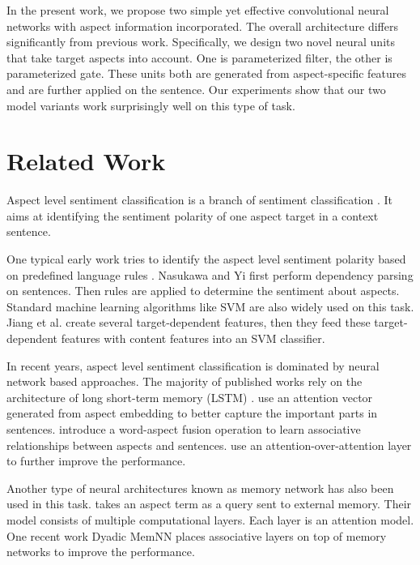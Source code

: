 \documentclass[11pt,a4paper]{article}
\begin{document}
In the present work, we propose two simple yet effective convolutional neural networks with aspect information incorporated. The overall architecture differs significantly from previous work. Specifically, we design two novel neural units that take target aspects into account. One is parameterized filter, the other is parameterized gate. These units both are generated from aspect-specific features and are further applied on the sentence. Our experiments show that our two model variants work surprisingly well on this type of task.  \section{Related Work}
Aspect level sentiment classification is a branch of sentiment classification \cite{pang2002thumbs,wang2012baselines}. It aims at identifying the sentiment polarity of one aspect target in a context sentence. 

One typical early work tries to identify the aspect level sentiment polarity based on predefined language rules \cite{nasukawa2003sentiment}. Nasukawa and Yi first perform dependency parsing on sentences. Then rules are applied to determine the sentiment about aspects. Standard machine learning algorithms like SVM are also widely used on this task. Jiang et al. create several target-dependent features, then they feed these target-dependent features with content features into an SVM classifier.

In recent years, aspect level sentiment classification is dominated by neural network based approaches. The majority of published works rely on the architecture of long short-term memory (LSTM) \cite{tang2015effective}.  use an attention vector generated from aspect embedding to better capture the important parts in sentences.  introduce a word-aspect fusion operation to learn associative relationships between aspects and sentences.  use an attention-over-attention layer to further improve the performance.

Another type of neural architectures known as memory network \cite{sukhbaatar2015end} has also been used in this task.  takes an aspect term as a query sent to external memory. Their model consists of multiple computational layers. Each layer is an attention model. One recent work Dyadic MemNN \cite{tay2017dyadic} places associative layers on top of memory networks to improve the performance.
\end{document}
